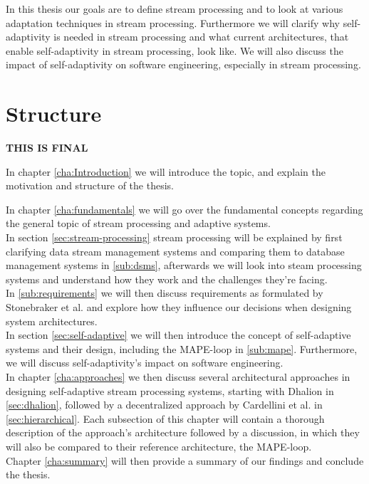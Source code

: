 In this thesis our goals are to define stream processing and to look at various adaptation techniques in stream processing. Furthermore we will clarify why
self-adaptivity is needed in stream processing and what current architectures, that enable self-adaptivity in stream processing, look like.
We will also discuss the impact of self-adaptivity on software engineering, especially in stream processing.


\section{Structure}
\label{sec:structure}
\textbf{\color{green}THIS IS FINAL}

In chapter \ref{cha:Introduction} we will introduce the topic, and explain the motivation and structure of the thesis.

In chapter \ref{cha:fundamentals} we will go over the fundamental concepts regarding the general topic of stream processing and adaptive systems.
\\
In section \ref{sec:stream-processing} stream processing will be explained by first clarifying data stream management systems and comparing them to database management systems 
in \ref{sub:dsms}, afterwards we will look into steam processing systems and understand how they work and the challenges they're facing.
\\
In \ref{sub:requirements} we will then discuss requirements as formulated by Stonebraker et al. and explore how they influence our decisions when designing system architectures.
\\
In section \ref{sec:self-adaptive} we will then introduce the concept of self-adaptive systems and their design, including the MAPE-loop in \ref{sub:mape}. 
Furthermore, we will discuss self-adaptivity's impact on software engineering.
\\
In chapter \ref{cha:approaches} we then discuss several architectural approaches in designing self-adaptive stream processing systems, starting with Dhalion in \ref{sec:dhalion}, 
followed by a decentralized approach by Cardellini et al. in \ref{sec:hierarchical}.
Each subsection of this chapter will contain a thorough description of the approach's architecture followed by a discussion, 
in which they will also be compared to their reference architecture, the MAPE-loop.
\\
Chapter \ref{cha:summary} will then provide a summary of our findings and conclude the thesis.